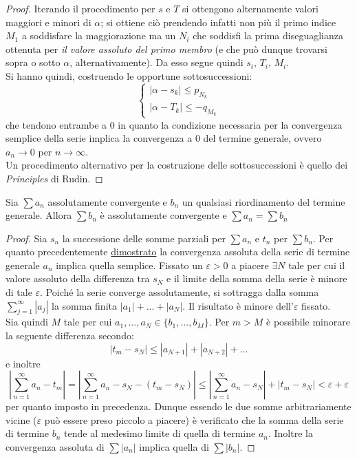 \documentclass[10pt, oneside]{book}
\theoremstyle{plain}
\begin{document}
\begin{proof}
    Iterando il procedimento per $s$ e $T$ si ottengono alternamente valori maggiori e minori di $\alpha$; si ottiene ciò prendendo infatti non più il primo indice $M_1$ a soddisfare la maggiorazione ma un $N_i$ che soddisfi la prima diseguaglianza ottenuta per \textit{il valore assoluto del primo membro} (e che può dunque trovarsi sopra o sotto $\alpha$, alternativamente). Da esso segue quindi $s_i$, $T_i$, $M_i$.\\
Si hanno quindi, costruendo le opportune sottosuccessioni:
    \[\begin{cases}
        |\alpha - s_k| \leq p_{N_k}\\
        |\alpha - T_k| \leq -q_{M_k}
    \end{cases}\]
    che tendono entrambe a 0 in quanto la condizione necessaria per la convergenza semplice della serie implica la convergenza a 0 del termine generale, ovvero $a_n \rightarrow 0$ per $n \rightarrow \infty$.\\
Un procedimento alternativo per la costruzione delle sottosuccessioni è quello dei \textit{Principles} di Rudin.
\end{proof}

\begin{ther}
    Sia $\sum a_n$ assolutamente convergente e $b_n$ un qualsiasi riordinamento del termine generale. Allora $\sum b_n$ è assolutamente convergente e $\sum a_n = \sum b_n$
\end{ther}
\begin{proof}
    Sia $s_n$ la successione delle somme parziali per $\sum a_n$ e $t_n$ per $\sum b_n$. Per quanto precedentemente \hyperlink{assolutamente}{dimostrato} la convergenza assoluta della serie di termine generale $a_n$ implica quella semplice. Fissato un $\varepsilon > 0$ a piacere $\exists N$ tale per cui il valore assoluto della differenza tra $s_N$ e il limite della somma della serie è minore di tale $\varepsilon$. Poiché la serie converge assolutamente, si sottragga dalla somma $\sum_{j=1}^\infty |a_j|$ la somma finita $|a_1| + ... + |a_N|$. Il risultato è minore dell'$\varepsilon$ fissato.
    \\Sia quindi $M$ tale per cui $a_1, ..., a_N \in \{b_1, ..., b_M\}$. Per $m > M$ è possibile minorare la seguente differenza secondo:
    \[|t_m - s_N| \leq |a_{N+1}| + |a_{N+2}| + ...\]
    e inoltre
    \[|\sum \limits_{n=1}^{\infty}a_n - t_m| = |\sum \limits_{n=1}^{\infty}a_n - s_N - (t_m - s_N)| \leq |\sum \limits_{n=1}^{\infty}a_n - s_N| + |t_m - s_N| < \varepsilon + \varepsilon\]
    per quanto imposto in precedenza. Dunque essendo le due somme arbitrariamente vicine ($\varepsilon$ può essere preso piccolo a piacere) è verificato che la somma della serie di termine $b_n$ tende al medesimo limite di quella di termine $a_n$. Inoltre la convergenza assoluta di $\sum |a_n|$ implica quella di $\sum |b_n|$.
\end{proof}
\end{document}
